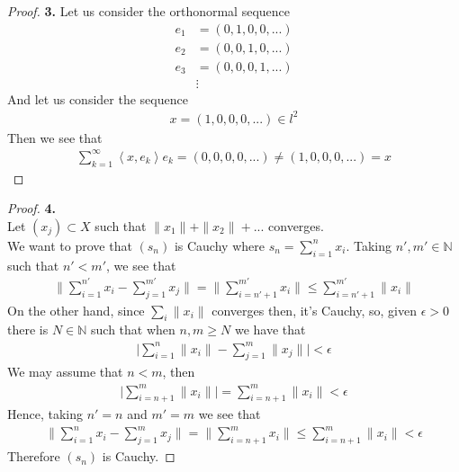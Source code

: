 \documentclass[11pt]{article}
\newcommand{\N}{\mathbb{N}}
\newcommand{\inprd}[1]{\left\langle{#1}\right\rangle}
\theoremstyle{definition}
\begin{document}
\cleardoublepage
\begin{proof}{\textbf{3.}}
Let us consider the orthonormal sequence
\begin{align*}
    e_1 &= (0, 1, 0, 0, ...)\\
    e_2 &= (0, 0, 1, 0, ...)\\
    e_3 &= (0, 0, 0, 1, ...)\\
    &\vdots
\end{align*}
And let us consider the sequence
\begin{align*}
    x = (1, 0, 0, 0, ...) \in l^2
\end{align*}
Then we see that
\begin{align*}
    \sum_{k=1}^\infty \inprd{x, e_k}e_k = (0, 0, 0, 0, ...)
    \neq (1, 0, 0, 0, ...) = x
\end{align*}
\end{proof}

\cleardoublepage
\begin{proof}{\textbf{4.}}\\
Let $(x_j)\subset X$ such that $\|x_1\| + \|x_2\| + ...$ converges.
\\
We want to prove that $(s_n)$ is Cauchy where $s_n = \sum_{i=1}^n x_i$.
Taking $n', m' \in \N$ such that $n' < m'$, we see that 
\begin{align*}
    \bigg\|\sum_{i=1}^{n'} x_i - \sum_{j=1}^{m'} x_j\bigg\|
    = \bigg\|\sum_{i=n'+1}^{m'} x_i\bigg\|
    \leq \sum_{i=n'+1}^{m'} \|x_i\|
\end{align*}
On the other hand, since $\sum_i \|x_i\|$ converges then, it's Cauchy, so,
given $\epsilon > 0$ there is $N\in \N$ such that when $n,m \geq N$ we have that
\begin{align*}
    \bigg|\sum_{i=1}^n\|x_i\| - \sum_{j=1}^m\|x_j\|\bigg| < \epsilon
\end{align*}
We may assume that $n < m$, then
\begin{align*}
    \bigg|\sum_{i=n+1}^m\|x_i\|\bigg| = \sum_{i=n+1}^m\|x_i\|< \epsilon
\end{align*}
Hence, taking $n' = n$ and $m' = m$ we see that
\begin{align*}
    \bigg\|\sum_{i=1}^{n} x_i - \sum_{j=1}^{m} x_j\bigg\|
    = \bigg\|\sum_{i=n+1}^{m} x_i\bigg\|
    \leq \sum_{i=n+1}^{m} \|x_i\| < \epsilon
\end{align*}
Therefore $(s_n)$ is Cauchy.
\end{proof}
\end{document}
